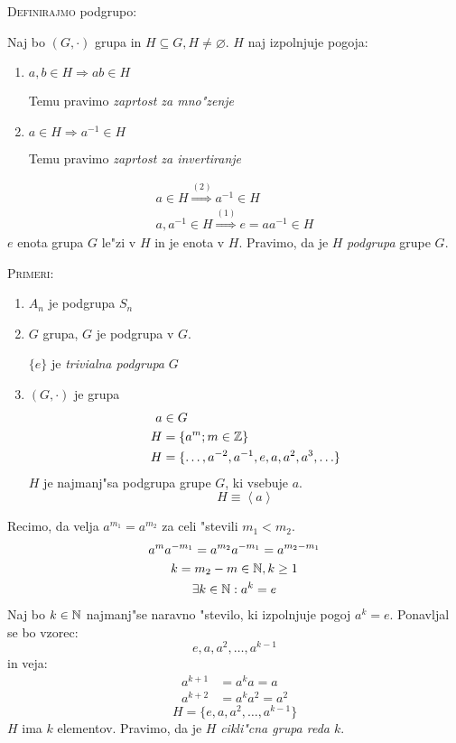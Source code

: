 \textsc{Definirajmo} podgrupo:

Naj bo $(G, \cdot)$ grupa in $H \subseteq G, H \neq \varnothing$. $H$ naj izpolnjuje pogoja:
\begin{enumerate}[(1)]
	\item $a, b \in H \Rightarrow ab \in H$
	
	Temu pravimo \emph{zaprtost za mno"zenje}
	
	\item $a \in H \Rightarrow a^{-1} \in H$
	
	Temu pravimo \emph{zaprtost za invertiranje}
\end{enumerate}

\begin{gather*}
a \in H \stackrel{(2)}{\Rightarrow} a^{-1} \in H \\
a, a^{-1} \in H \stackrel{(1)}{\Rightarrow} e = aa^{-1} \in H
\end{gather*}
$e$ enota grupa $G$ le"zi v $H$ in je enota v $H$. Pravimo, da je $H$ \emph{podgrupa} grupe $G$.

\textsc{Primeri:}
\begin{enumerate}[(1)]
	\item $A_n$ je podgrupa $S_n$
	\item $G$ grupa, $G$ je podgrupa v $G$.
	
	$\{e\}$ je \emph{trivialna podgrupa} $G$
	
	\item $(G, \cdot)$ je grupa
	\begin{align*}
	a &\in G \\
	H &= \{a^m; m \in \mathbb{Z}\} \\
	H &= \{\ldots, a^{-2}, a^{-1}, e ,a, a^2, a^3, \ldots \} \\
	\end{align*}
	$H$ je najmanj"sa podgrupa grupe $G$, ki vsebuje $a$.
	\begin{equation*}
	H \equiv \left<a\right>
	\end{equation*}
\end{enumerate}

Recimo, da velja $a^{m_1} = a^{m_2}$ za celi "stevili $m_1 < m_2$.
\begin{gather*}
a^m a^{-m_1} = a^{m_2} a^{-m_1} = a^{m_2 - m_1} \\
k = m_2 - m \in \mathbb{N}, k \geq 1 \\
\exists k \in \mathbb{N}: a^k = e
\end{gather*}
Naj bo $k \in \mathbb{N}$ najmanj"se naravno "stevilo, ki izpolnjuje pogoj $a^k = e$. Ponavljal se bo vzorec:
\begin{equation*}
e, a, a^2, \ldots, a^{k-1}
\end{equation*}
in veja:
\begin{align*}
	a^{k+1} &= a^k a = a \\
	a^{k+2} &= a^k a^2 = a^2
\end{align*}
\begin{equation*}
H = \{e, a, a^2, \ldots, a^{k-1}\}
\end{equation*}
$H$ ima $k$ elementov. Pravimo, da je $H$ \emph{cikli"cna grupa reda $k$}.

